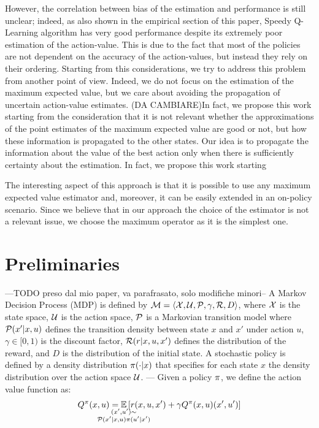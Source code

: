 \documentclass[conference]{IEEEtran}
\begin{document}
However, the correlation between bias of the estimation and performance is still unclear; indeed, as also shown in the empirical section of this paper, Speedy Q-Learning algorithm \cite{NIPS2011_4251} has very good performance despite its extremely poor estimation of the action-value. This is due to the fact that most of the policies are not dependent on the accuracy of the action-values, but instead they rely on their ordering. Starting from this considerations, we try to address this problem from another point of view. Indeed, we do not focus on the estimation of the maximum expected value, but we care about avoiding the propagation of uncertain action-value estimates. (DA CAMBIARE)In fact, we propose this work starting from the consideration that it is not relevant whether the approximations of the point estimates of the maximum expected value are good or not, but how these information is propagated to the other states. Our idea is to propagate the information about the value of the best action only when there is sufficiently certainty about the estimation.
In fact, we propose this work starting

The interesting aspect of this approach is that it is possible to use any maximum expected value estimator and, moreover, it can be easily extended in an on-policy scenario. Since we believe that in our approach the choice of the estimator is not a relevant issue, we choose the maximum operator as it is the simplest one.

\section{Preliminaries}
---TODO preso dal mio paper, va parafrasato, solo modifiche minori--
A Markov Decision Process (MDP) is defined by $\mathcal{M} = \langle \mathcal X,\mathcal U,\mathcal{P},\gamma,\mathcal{R}, D\rangle$, where $\mathcal X$ is the state space, $\mathcal U$ is the action space, $\mathcal{P}$ is a Markovian transition model where $\mathcal{P}(x'|x,u)$ defines the transition density between state $x$ and $x'$ under action $u$, $\gamma\in[0,1)$ is the discount factor, $\mathcal{R}(r|x, u, x')$ defines the distribution of the reward, and $D$ is the distribution of the initial state.
A stochastic policy is defined by a density distribution $\pi(\cdot|x)$ that specifies for each state $x$ the density distribution over the action space $\mathcal U$.
---
Given a policy $\pi$, we define the action value function as:
\begin{align}
 Q^\pol(x,u)=\underset{\strut\mathclap{\substack{(x', u')\sim \\ \Pmodel(x'|x,u)\pol(u'|x')}}}{\mathbb{E}}\left[ r(x,u,x')+\gamma Q^\pol(x,u)(x',u')\right]
 \label{eq:qpol}
\end{align}
\end{document}
